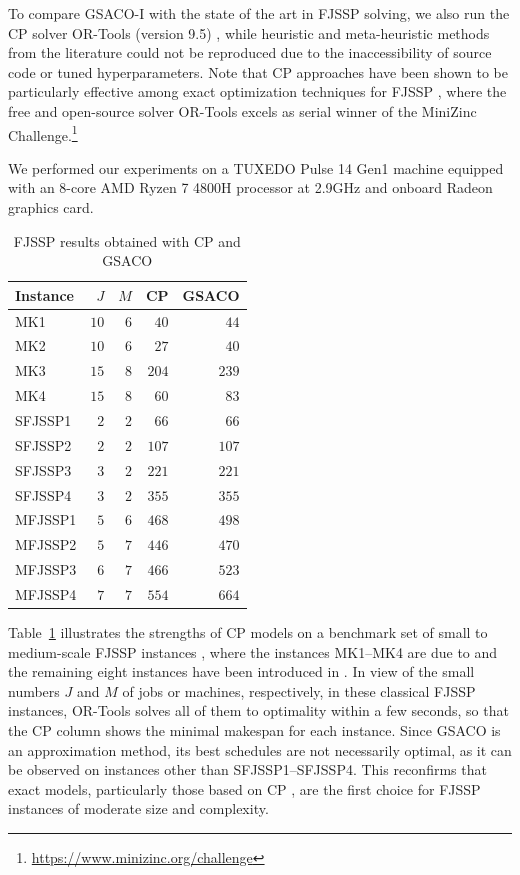 To compare GSACO-I with the state of the art in FJSSP solving,
we also run the CP solver OR-Tools (version 9.5) \cite{pediga23a},
while heuristic and meta-heuristic methods from the literature could not
be reproduced due to the inaccessibility of source code or tuned hyperparameters.
Note that CP approaches have been shown to be particularly effective among
exact optimization techniques for FJSSP \cite{kubec16a},
where the free and open-source solver OR-Tools excels
as serial winner of the Mi\-ni\-Zinc Challenge.\footnote{\url{https://www.minizinc.org/challenge}}

We performed our experiments on a TUXEDO Pulse 14 Gen1 machine
equipped with an 8-core AMD Ryzen 7 4800H processor at 2.9GHz and onboard
Radeon graphics card.

\begin{table}[t]
	\caption{FJSSP results obtained with CP and GSACO}\label{tab:benchmarkresults} \centering
	\begin{tabular}{|lr|r|r|r|}
		\hline
		Instance & $J$  & $M$ & CP  & GSACO \\ \hline
		MK1      & $10$ & $6$ & $40$  & $44$     \\ 
		MK2      & $10$ & $6$ & $27$  & $40$     \\ 
		MK3      & $15$ & $8$ & $204$ & $239$    \\ 
		MK4      & $15$ & $8$ & $60$  & $83$     \\ 
		SFJSSP1   & $2$ & $2$ & $66$  & $66$     \\ 
		SFJSSP2   & $2$ & $2$ & $107$ & $107$    \\ 
		SFJSSP3   & $3$ & $2$ & $221$ & $221$    \\ 
		SFJSSP4   & $3$ & $2$ & $355$ & $355$    \\ 
		MFJSSP1   & $5$ & $6$ & $468$ & $498$    \\ 
		MFJSSP2   & $5$ & $7$ & $446$ & $470$    \\ 
		MFJSSP3   & $6$ & $7$ & $466$ & $523$    \\ 
		MFJSSP4   & $7$ & $7$ & $554$ & $664$    \\ 
		\hline
	\end{tabular}
\end{table}

Table~\ref{tab:benchmarkresults} illustrates the strengths of CP models on a benchmark set of
small to medium-scale FJSSP instances \cite{arnaout2014two},
where the instances MK1--MK4 are due to 
\cite{brandimarte1993routing} and the remaining eight instances
have been introduced in
\cite{fattahi2007mathematical}.
In view of the small numbers $J$ and $M$ of jobs or machines, respectively,
in these classical FJSSP instances,
OR-Tools solves all of them to optimality within a few seconds,
so that the CP column shows the minimal makespan for each instance.
Since GSACO is an approximation method, its best schedules are not
necessarily optimal, as it can be observed on instances other than
SFJSSP1--SFJSSP4.
This reconfirms that exact models,
particularly those based on CP \cite{kubec16a},
are the first choice for FJSSP instances
of moderate size and complexity.%
%

